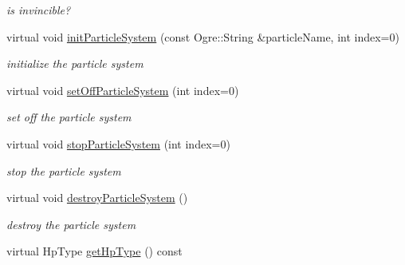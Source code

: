 \begin{DoxyCompactItemize}
\begin{DoxyCompactList}\small\item\em is invincible? \end{DoxyCompactList}\item 
virtual void \hyperlink{class_n_c_t_u_1_1_obstacle_a4b7ee4353297cd13f73f7a9e2e851264}{init\+Particle\+System} (const Ogre\+::\+String \&particle\+Name, int index=0)\hypertarget{class_n_c_t_u_1_1_obstacle_a4b7ee4353297cd13f73f7a9e2e851264}{}\label{class_n_c_t_u_1_1_obstacle_a4b7ee4353297cd13f73f7a9e2e851264}

\begin{DoxyCompactList}\small\item\em initialize the particle system \end{DoxyCompactList}\item 
virtual void \hyperlink{class_n_c_t_u_1_1_obstacle_ab6bf4ec6684528fca9b1e4cf7a273cc3}{set\+Off\+Particle\+System} (int index=0)\hypertarget{class_n_c_t_u_1_1_obstacle_ab6bf4ec6684528fca9b1e4cf7a273cc3}{}\label{class_n_c_t_u_1_1_obstacle_ab6bf4ec6684528fca9b1e4cf7a273cc3}

\begin{DoxyCompactList}\small\item\em set off the particle system \end{DoxyCompactList}\item 
virtual void \hyperlink{class_n_c_t_u_1_1_obstacle_aa156cccecda15fcfb0a51bf2fe93be07}{stop\+Particle\+System} (int index=0)\hypertarget{class_n_c_t_u_1_1_obstacle_aa156cccecda15fcfb0a51bf2fe93be07}{}\label{class_n_c_t_u_1_1_obstacle_aa156cccecda15fcfb0a51bf2fe93be07}

\begin{DoxyCompactList}\small\item\em stop the particle system \end{DoxyCompactList}\item 
virtual void \hyperlink{class_n_c_t_u_1_1_obstacle_a616b49cf5897581a78308498b3fbd15a}{destroy\+Particle\+System} ()\hypertarget{class_n_c_t_u_1_1_obstacle_a616b49cf5897581a78308498b3fbd15a}{}\label{class_n_c_t_u_1_1_obstacle_a616b49cf5897581a78308498b3fbd15a}

\begin{DoxyCompactList}\small\item\em destroy the particle system \end{DoxyCompactList}\item 
virtual Hp\+Type \hyperlink{class_n_c_t_u_1_1_obstacle_a6314a48b3bf0b389f2718bca6a6ba226}{get\+Hp\+Type} () const \hypertarget{class_n_c_t_u_1_1_obstacle_a6314a48b3bf0b389f2718bca6a6ba226}{}\label{class_n_c_t_u_1_1_obstacle_a6314a48b3bf0b389f2718bca6a6ba226}


\end{DoxyCompactItemize}
